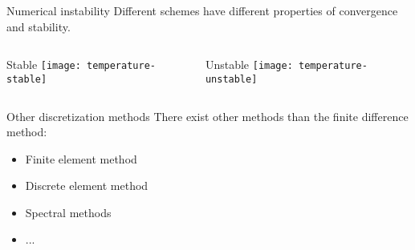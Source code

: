     \begin{frame}{Numerical instability}
      Different schemes have different properties of
      \alert{convergence} and \alert{stability}.
      \begin{columns}
      \column{60mm}
        \begin{block}{Stable}
          \texttt{[image: temperature-stable]}
        \end{block}
      \pause
      \column{60mm}
        \begin{block}{Unstable}
          \texttt{[image: temperature-unstable]}
        \end{block}
      \end{columns}
    \end{frame}

    \begin{frame}{Other discretization methods}
      There exist other methods than the \alert{finite difference} method:
      \begin{itemize}
        \item Finite element method
        \item Discrete element method
        \item Spectral methods
        \item ...
      \end{itemize}
    \end{frame}
